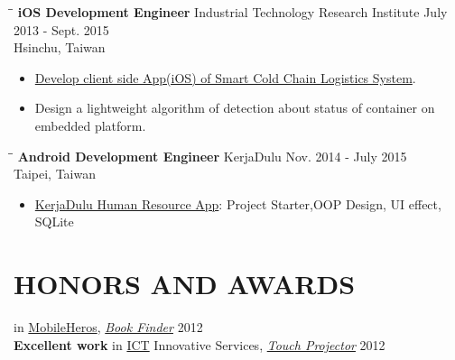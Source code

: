 \documentclass{res}
\begin{document}
\begin{resume}
\begin{itemize}
				\end{itemize}
				\begin{tabbing}
	 				\hspace{2.3in}\= \hspace{2.6in}\= \kill %
					{\bf iOS Development Engineer} \>Industrial Technology Research Institute	
					\>July 2013 - Sept. 2015\\
													\>Hsinchu, Taiwan
	 			\end{tabbing}
	 			\vspace{-20pt}
	 			\vspace{0.2in}	
				\begin{itemize}
					\item \href{http://www.ece.uci.edu/~chou/pdf/chou-ithings14container2.pdf}{Develop client side App(iOS) of Smart Cold Chain Logistics System}.
					\vspace{-0.05in}	
					\item Design a lightweight algorithm of detection about status of container on embedded platform.
				\end{itemize}
				\begin{tabbing}%
					\hspace{2.3in}\= \hspace{2.6in}\= \kill %
	 				{\bf Android Development Engineer }  \>KerjaDulu\> Nov. 2014 - July 2015\\
													\>Taipei, Taiwan
				\end{tabbing}
				\vspace{-20pt}
				\vspace{0.2in}	
				\begin{itemize}
					\item {\href{https://play.google.com/store/apps/details?id=com.kerjadulu.kerjadulu&hl=zh_TW}{KerjaDulu Human Resource App}}: Project Starter,OOP Design, UI effect, SQLite
				\end{itemize}

			

			
			\vspace{-0.1in}
			\section{HONORS AND AWARDS}  
			        
				 in \href{https://www.mobilehero.com/component/k2/item/209-a2012_11-10.html?Itemid=196}{MobileHeros}, \href{https://www.youtube.com/watch?v=BvLKtrgq_yw}{\sl B​ook Finder} \hfill 2012\\
				{\bf Excellent work} in \href{http://innoserve.tca.org.tw/en/index.aspx}{ICT} Innovative Services, \href{https://www.youtube.com/watch?v=nt4eUAXqXyk}{\sl T​ouch Projector​} \hfill 2012\\  
	

\end{resume}
\end{document}
